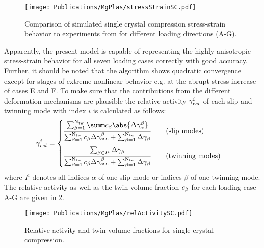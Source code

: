   \begin{figure}[!ht]
    \centering
    \texttt{[image: Publications/MgPlas/stressStrainSC.pdf]}
    \caption{Comparison of simulated single crystal compression stress-strain behavior to experiments from  for different loading directions (A-G).}
    \label{fig:StressStrainSC}
  \end{figure}
  Apparently, the present model is capable of representing the highly anisotropic stress-strain behavior for all seven loading cases correctly with good accuracy. Further, it should be noted that the algorithm shows quadratic convergence except for stages of extreme nonlinear behavior e.g. at the abrupt stress increase of cases E and F. To make sure that the contributions from the different deformation mechanisms are plausible the relative activity $\gamma_{rel}^{i}$ of each slip and twinning mode with index $i$ is calculated as follows:
  \begin{equation}
    \gammareli = 
    \begin{cases}
      \displaystyle \frac{\sumbI \summ \cb \abs{\Delta\gammaab}}{\sumbI \cb \Delta\gammaaccb + \sumbI \Delta\gammab} \qquad \text{(slip modes)}\\[15pt]
      \displaystyle \frac{\sum_{\beta \in I^i} \Delta\gammab}{\sumbI \cb \Delta\gammaaccb + \sumbI \Delta\gammab} \qquad \text{(twinning modes)}
    \end{cases}
  \end{equation}
  where $I^i$ denotes all indices $\alpha$ of one slip mode or indices $\beta$ of one twinning mode.  
  The relative activity as well as the twin volume fraction $c_{\beta}$ for each loading case A-G are given in \cref{fig:relAct}.
  
  \begin{figure}[ht!]
    \centering
    \texttt{[image: Publications/MgPlas/relActivitySC.pdf]}
    \caption{Relative activity and twin volume fractions for single crystal compression.}
    \label{fig:relAct}
  \end{figure}
  
